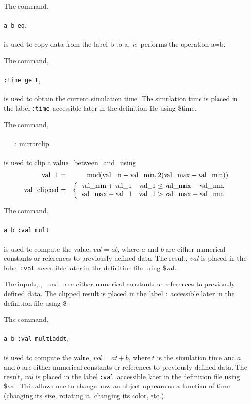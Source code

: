 \documentclass[11pt,twoside]{book}
\newcommand{\hitem}[1]{\item[{\bf #1} \hfill]}
\begin{document}
\hitem{eq}
The command, \\
\\
{\tt a b eq}, \\
\\
is used to copy data from the label b to a, {\em ie}\ performs the operation a=b.

\hitem{gett}
The command, \\
\\
{\tt :time gett}, \\
\\
is used to obtain the current simulation time.
The simulation time is placed in the label {\tt :time}\ accessible later
in the definition file using \$time.

\hitem{mirrorclip}
The command, \\
\\
\valin\ \valmin\ \valmax\ :\valclipped\ mirrorclip, \\
\\
is used to clip a value \valin\ between \valmin\
and \valmax\ using
\begin{eqnarray}
{\tt \mbox{val\_1}}&=&\mbox{mod}( {\tt \mbox{val\_in}}-{\tt \mbox{val\_min}},2({\tt \mbox{val\_max}}-{\tt \mbox{val\_min}}) )\\
{\tt \mbox{val\_clipped}}&=&\left\{
\begin{array}{cc}
  {\tt \mbox{val\_min}}+{\tt \mbox{val\_1}} & {\tt \mbox{val\_1}}\le {\tt \mbox{val\_max}}-{\tt \mbox{val\_min}} \\
  {\tt \mbox{val\_max}}-{\tt \mbox{val\_1}} & {\tt \mbox{val\_1}}> {\tt \mbox{val\_max}}-{\tt \mbox{val\_min}}
\end{array}
\right.
\end{eqnarray}

\hitem{mult}
The command, \\
\\
{\tt a b :val mult}, \\
\\
is used to compute the value, $val=ab$, where $a$ and $b$ are either
numerical constants or references to previously defined data.
The result, $val$ is placed in the label {\tt :val}\ accessible
later in the definition file using \$val.

\noindent The inputs, \valin, \valmin\ and \valmax\ are either
numerical constants or references to previously defined data.
The clipped result is placed in the label :\valclipped\ accessible
later in the definition file using \$\valclipped.

\hitem{multiaddt}
The command, \\
\\
{\tt a b :val multiaddt}, \\
\\
is used to compute the value, $val=at+b$, where $t$ is the simulation
time and $a$ and $b$ are either numerical constants or references to
previously defined data. The result, $val$ is placed in the label
{\tt :val}\ accessible later in the definition file using \$val.
This allows one to change how an object appears as a function of
time (changing its size, rotating it, changing its color, etc.).
\end{document}
